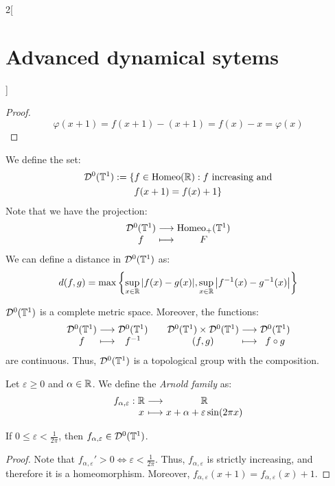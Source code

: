 \documentclass[../../../main_math.tex]{subfiles}
\begin{document}
\begin{multicols}{2}[\section{Advanced dynamical sytems}]
\begin{proof}
    $$
      \varphi(x+1)=f(x+1)-(x+1)=f(x)-x=\varphi(x)
    $$
  \end{proof}
  \begin{definition}
    We define the set:
    \begin{multline*}
      \mathcal{D}^0(\mathbb{T}^1):=\{f\in \mathrm{Homeo}(\mathbb{R}):f\text{ increasing and}\\ f(x+1)=f(x)+1\}
    \end{multline*}
    Note that we have the projection:
    $$
      \function{}{\mathcal{D}^0(\TT^1)}{\Homeoplus(\TT^1)}{f}{F}
    $$
    We can define a distance in $\mathcal{D}^0(\mathbb{T}^1)$ as:
    $$
      d(f,g)=\max\left\{ \sup_{x\in\mathbb{R}}\abs{f(x)-g(x)},\sup_{x\in\mathbb{R}}\abs{f^{-1}(x)-g^{-1}(x)}\right\}
    $$
  \end{definition}
  \begin{lemma}
    $\mathcal{D}^0(\mathbb{T}^1)$ is a complete metric space. Moreover, the functions:
    $$
      \function{}{\mathcal{D}^0(\TT^1)}{\mathcal{D}^0(\TT^1)}{f}{f^{-1}}\quad
      \function{}{\mathcal{D}^0(\TT^1)\times \mathcal{D}^0(\TT^1)}{\mathcal{D}^0(\TT^1)}{(f,g)}{f\circ g}
    $$
    are continuous.
    Thus, $\mathcal{D}^0(\mathbb{T}^1)$ is a topological group with the composition.
  \end{lemma}
  \begin{definition}
    Let $\varepsilon\geq 0$ and $\alpha\in\mathbb{R}$. We define the \emph{Arnold family} as:
    $$
      \function{f_{\alpha,\varepsilon}}{\RR}{\RR}{x}{x+\alpha+\varepsilon\sin(2\pi x)}
    $$
  \end{definition}
  \begin{lemma}
    If $0\leq \varepsilon<\frac{1}{2\pi}$, then $f_{\alpha,\varepsilon}\in \mathcal{D}^0(\mathbb{T}^1)$.
  \end{lemma}
  \begin{proof}
    Note that ${f_{\alpha,\varepsilon}}'>0\iff \varepsilon<\frac{1}{2\pi}$. Thus, $f_{\alpha,\varepsilon}$ is strictly increasing, and therefore it is a homeomorphism. Moreover, $f_{\alpha,\varepsilon}(x+1)=f_{\alpha,\varepsilon}(x)+1$.
  \end{proof}

\end{multicols}
\end{document}

